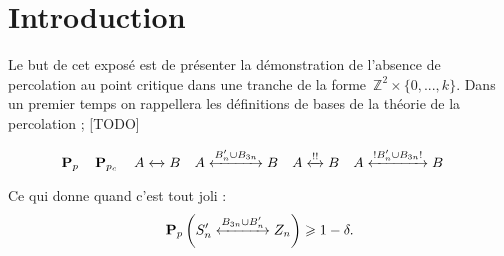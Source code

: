		\chapter*{Introduction}
		Le but de cet exposé est de présenter la démonstration de l'absence de percolation au point critique dans une tranche de la forme~$\mathbb{Z}^2\times\{0,...,k\}$. Dans un premier temps on rappellera les définitions de bases de la théorie de la percolation ; [TODO]
		
		\[
			\Pp								\quad
			\Pp[p_c]						\quad
			\relie{A}{B}					\quad
			\relie[B_n'\cup B_{3n}]{A}{B}	\quad
			\relie*{A}{B}					\quad
			\relie*[B_n'\cup B_{3n}]{A}{B}	\quad
		\]
		
		Ce qui donne quand c'est tout joli :
		\[
			\Pp\left(\relie[B_{3n}\cup B_n']{S_n'}{Z_n}\right) \geq 1 - \delta.
		\]
		
		\Tbreak
